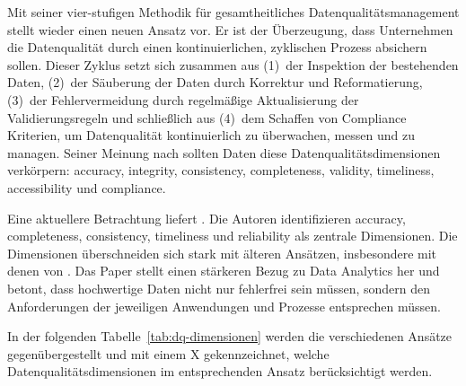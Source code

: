 \documentclass[../main.tex]{subfiles}
\begin{document}
Mit seiner vier-stufigen Methodik für gesamtheitliches Datenqualitätsmanagement stellt \textcite{marshDrowningDirtyData2005} wieder einen neuen Ansatz vor. Er ist der Überzeugung, dass Unternehmen die Datenqualität durch einen kontinuierlichen, zyklischen Prozess absichern sollen. Dieser Zyklus setzt sich zusammen aus (1)~der Inspektion der bestehenden Daten, (2)~der Säuberung der Daten durch Korrektur und Reformatierung, (3)~der Fehlervermeidung durch regelmäßige Aktualisierung der Validierungsregeln und schließlich aus (4)~dem Schaffen von Compliance Kriterien, um Datenqualität kontinuierlich zu überwachen, messen und zu managen. Seiner Meinung nach sollten Daten diese Datenqualitätsdimensionen verkörpern: accuracy, integrity, consistency, completeness, validity, timeliness, accessibility und compliance.

Eine aktuellere Betrachtung liefert \textcite{rangineniReviewEnhancingData2023}. Die Autoren identifizieren accuracy, completeness, consistency, timeliness und reliability als zentrale Dimensionen. Die Dimensionen überschneiden sich stark mit älteren Ansätzen, insbesondere mit denen von \textcite{wangAccuracyWhatData1996}. Das Paper stellt einen stärkeren Bezug zu Data Analytics her und betont, dass hochwertige Daten nicht nur fehlerfrei sein müssen, sondern den Anforderungen der jeweiligen Anwendungen und Prozesse entsprechen müssen.

In der folgenden Tabelle~\ref{tab:dq-dimensionen} werden die verschiedenen Ansätze gegenübergestellt und mit einem X gekennzeichnet, welche Datenqualitätsdimensionen im entsprechenden Ansatz berücksichtigt werden.

\begingroup
\small 
\renewcommand{\arraystretch}{1.0}
\setlength{\tabcolsep}{4pt}
\end{document}
